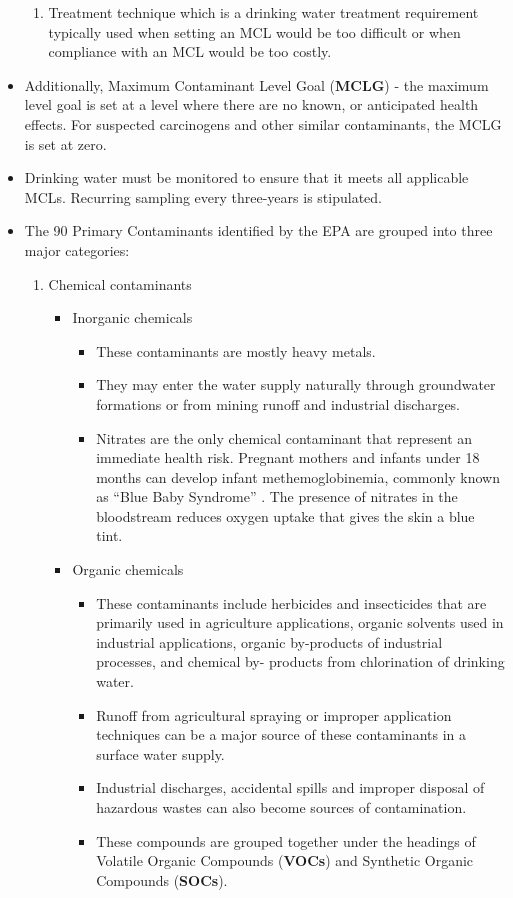 \begin{itemize}
\begin{enumerate}
\item Treatment technique which is a drinking water treatment requirement typically used when setting an MCL would be too difficult or when compliance with an MCL would be too costly.
\end{enumerate}
\item Additionally, Maximum Contaminant Level Goal (\textbf{MCLG}) - the maximum level goal is set at a level where there are no known, or anticipated health effects.  For suspected carcinogens and other similar contaminants, the MCLG is set at zero.
\item Drinking water must be monitored to ensure that it meets all applicable MCLs. Recurring sampling every three-years is stipulated.
\item The 90 Primary Contaminants identified by the EPA are grouped into three major categories:
\begin{enumerate}
\item Chemical contaminants
\begin{itemize}
\item Inorganic chemicals
\begin{itemize}
\item These contaminants are mostly heavy metals. 
\item They may enter the water supply naturally through groundwater formations or from mining runoff and industrial discharges.
\item Nitrates are the only chemical contaminant that represent an immediate health risk. Pregnant mothers and infants under 18 months can develop infant methemoglobinemia, commonly known as “Blue Baby Syndrome”  . The presence of nitrates in the bloodstream reduces oxygen uptake that gives the skin a blue tint.
\end{itemize}
\item Organic chemicals
\begin{itemize}
\item These contaminants include herbicides and insecticides that are primarily used in agriculture applications, organic solvents used in industrial applications, organic by-products of industrial processes, and chemical by- products from chlorination of drinking water.
\item Runoff from agricultural spraying or improper application techniques can be a major source of these contaminants in a surface water supply.
\item Industrial discharges, accidental spills and improper disposal of hazardous wastes can also become sources of contamination.
\item These compounds are grouped together under the headings of Volatile Organic Compounds (\textbf{VOCs}) and Synthetic Organic Compounds (\textbf{SOCs}). 


\end{itemize}
\end{itemize}
\end{enumerate}
\end{itemize}
